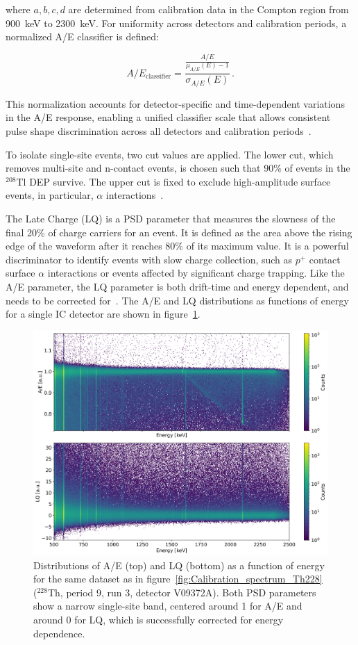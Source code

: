 \noindent where $a,b,c,d$ are determined from calibration data in the Compton region from 900~keV to 2300~keV.  
For uniformity across detectors and calibration periods, a normalized A/E classifier is defined:


\begin{equation}
\label{eq:AoE_Classifier}
A/E_{\mathrm{classifier}} = \frac{\frac{A/E}{\mu_{A/E}(E) - 1}}{\sigma_{A/E}(E)} \,.
\end{equation}

This normalization accounts for detector-specific and time-dependent variations in the A/E response, enabling a unified classifier scale that allows consistent pulse shape discrimination across all detectors and calibration periods~\cite{lnote_24013}.


To isolate single-site events, two cut values are applied. 
The lower cut, which removes multi-site and n-contact events, is chosen such that 90\% of events in the $^{208}$Tl DEP survive. The upper cut is fixed to exclude high-amplitude surface events, in particular, $\alpha$ interactions~\cite{agostini_pulse_2022}.

The Late Charge (LQ) is a PSD parameter that measures the slowness of the final 20\% of charge carriers for an event. It is defined as the area above the rising edge of the waveform after it reaches 80\% of its maximum value. It is a powerful discriminator to identify events with slow charge collection, such as $p^{+}$ contact surface $\alpha$ interactions or events affected by significant charge trapping. 
Like the A/E parameter, the LQ parameter is both drift-time and energy dependent, and needs to be corrected for~\cite{lnote_24013}. 
The A/E and LQ distributions as functions of energy for a single IC detector are shown in figure~\ref{fig:Aoe_LQ_spectra}. 

\begin{figure}
    \centering
    \includegraphics[width=0.85\linewidth]{figures/03_legend/Plot_Aoe_LQ_V09372A.png}
    \caption{Distributions of A/E (top) and LQ (bottom) as a function of energy for the same dataset as in figure~\ref{fig:Calibration_spectrum_Th228} ($^{228}$Th, period 9, run 3, detector V09372A). Both PSD parameters show a narrow single-site band, centered around 1 for A/E and around 0 for LQ, which is successfully corrected for energy dependence. }
    \label{fig:Aoe_LQ_spectra}
\end{figure}